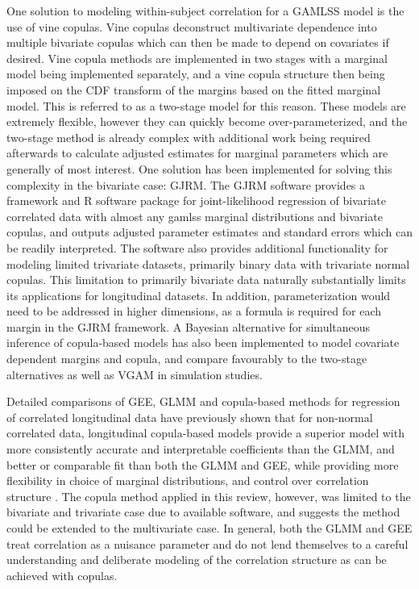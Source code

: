 \documentclass{article}
\begin{document}
One solution to modeling within-subject correlation for a GAMLSS model is the use of vine copulas. Vine copulas \cite{czado_vine_2022} deconstruct multivariate dependence into multiple bivariate copulas which can then be made to depend on covariates if desired. Vine copula methods are implemented in two stages with a marginal model being implemented separately, and a vine copula structure then being imposed on the CDF transform of the margins based on the fitted marginal model. This is referred to as a two-stage model for this reason. These models are extremely flexible, however they can quickly become over-parameterized, and the two-stage method is already complex with additional work being required afterwards to calculate adjusted estimates for marginal parameters which are generally of most interest. One solution has been implemented for solving this complexity in the bivariate case: GJRM. The GJRM software \citep{Marra2017} provides a framework and R software package for joint-likelihood regression of bivariate correlated data with almost any gamlss marginal distributions and bivariate copulas, and outputs adjusted parameter estimates and standard errors which can be readily interpreted. The software also provides additional functionality for modeling limited trivariate datasets, primarily binary data with trivariate normal copulas. This limitation to primarily bivariate data naturally substantially limits its applications for longitudinal datasets. In addition, parameterization would need to be addressed in higher dimensions, as a formula is required for each margin in the GJRM framework. A Bayesian alternative for simultaneous inference of copula-based models has also been implemented to model covariate dependent margins and copula, and compare favourably to the two-stage alternatives as well as VGAM in simulation studies\cite{Klein2016}.

Detailed comparisons of GEE, GLMM and copula-based methods for regression of correlated longitudinal data have previously shown that for non-normal correlated data, longitudinal copula-based models provide a superior model with more consistently accurate and interpretable coefficients than the GLMM, and better or comparable fit than both the GLMM and GEE, while providing more flexibility in choice of marginal distributions, and control over correlation structure \cite{sareffhibbert2025comparisoncopulabasedmixedmodel}. The copula method applied in this review, however, was limited to the bivariate and trivariate case due to available software, and suggests the method could be extended to the multivariate case. In general, both the GLMM and GEE treat correlation as a nuisance parameter and do not lend themselves to a careful understanding and deliberate modeling of the correlation structure as can be achieved with copulas.
\end{document}
